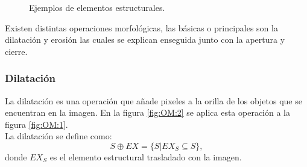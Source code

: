 \begin{figure}[h!]
\centering
{} \qquad
{} \qquad
{} 
\caption{Ejemplos de elementos estructurales.} \label{fig:EX}
\end{figure} 

Existen distintas operaciones morfológicas, las básicas o principales son la dilatación y erosión las cuales se explican enseguida junto con la apertura y cierre. 
 
\subsubsection{Dilatación}\label{sssec:Dilatation}
La dilatación es una operación que añade pixeles a la orilla de los objetos que se encuentran en la imagen. En la figura \ref{fig:OM:2} 
se aplica esta operación a la figura \ref{fig:OM:1}.\\
La dilatación se define como:  
$$S \oplus EX = \lbrace S|EX_S \subseteq S \rbrace,$$  
donde $EX_S$ es el elemento estructural trasladado con la imagen. 

